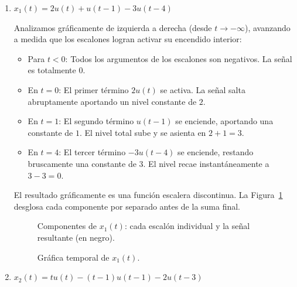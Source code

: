 \documentclass[10pt,a4paper]{article}
\begin{document}
	\begin{enumerate}[label=\textbf{\alph*)}]
		\item \textbf{$x_1(t)=2u(t)+u(t-1)-3u(t-4)$}
		
		Analizamos gráficamente de izquierda a derecha (desde $t \to -\infty$), avanzando a medida que los escalones logran activar su encendido interior:
		\begin{itemize}
		    \item Para $t<0$: Todos los argumentos de los escalones son negativos. La señal es totalmente $0$.
		    \item En $t=0$: El primer término $2u(t)$ se activa. La señal salta abruptamente aportando un nivel constante de $2$.
		    \item En $t=1$: El segundo término $u(t-1)$ se enciende, aportando una constante de $1$. El nivel total sube y se asienta en $2+1 = 3$.
		    \item En $t=4$: El tercer término $-3u(t-4)$ se enciende, restando bruscamente una constante de $3$. El nivel recae instantáneamente a $3 - 3 = 0$.
		\end{itemize}
		El resultado gráficamente es una función escalera discontinua. La Figura~\ref{fig:ejer1a_sum} desglosa cada componente por separado antes de la suma final.
		
		\begin{figure}[H]
			\centering
			
			\caption{Componentes de $x_1(t)$: cada escalón individual y la señal resultante (en negro).}
			\label{fig:ejer1a_sum}
		\end{figure}

		\begin{figure}[H]
			\centering
			
			\caption{Gráfica temporal de $x_1(t)$.}
			\label{fig:ejer1a}
		\end{figure}

		\item \textbf{$x_2(t)=tu(t)-(t-1)u(t-1)-2u(t-3)$}
		

\end{enumerate}
\end{document}
